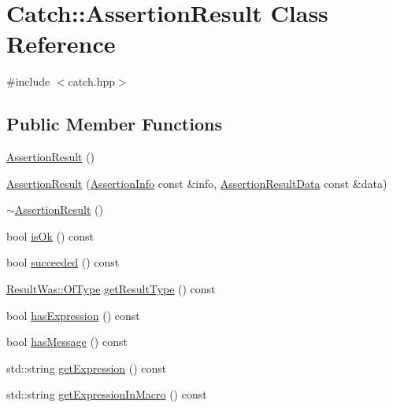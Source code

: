 \hypertarget{class_catch_1_1_assertion_result}{}\section{Catch\+:\+:Assertion\+Result Class Reference}
\label{class_catch_1_1_assertion_result}


{\ttfamily \#include $<$catch.\+hpp$>$}

\subsection*{Public Member Functions}
\begin{DoxyCompactItemize}
\item 
\mbox{\hyperlink{class_catch_1_1_assertion_result_a570b999c5f66e33cb31d3adb29fec25b}{Assertion\+Result}} ()
\item 
\mbox{\hyperlink{class_catch_1_1_assertion_result_ab58aeec27052ba400633ed0e36cea692}{Assertion\+Result}} (\mbox{\hyperlink{struct_catch_1_1_assertion_info}{Assertion\+Info}} const \&info, \mbox{\hyperlink{struct_catch_1_1_assertion_result_data}{Assertion\+Result\+Data}} const \&data)
\item 
\mbox{\hyperlink{class_catch_1_1_assertion_result_abf90f5abd04d38b2fb4f5d575bdc4f1e}{$\sim$\+Assertion\+Result}} ()
\item 
bool \mbox{\hyperlink{class_catch_1_1_assertion_result_ae39658b71c4afc3c8a859043b0e97027}{is\+Ok}} () const
\item 
bool \mbox{\hyperlink{class_catch_1_1_assertion_result_ac5cc872b721d5fb65d87221d30b22fdd}{succeeded}} () const
\item 
\mbox{\hyperlink{struct_catch_1_1_result_was_a624e1ee3661fcf6094ceef1f654601ef}{Result\+Was\+::\+Of\+Type}} \mbox{\hyperlink{class_catch_1_1_assertion_result_ac810750194e1722489d2fd16e8c6a4a8}{get\+Result\+Type}} () const
\item 
bool \mbox{\hyperlink{class_catch_1_1_assertion_result_aba37b4fef1015989df2136592958e984}{has\+Expression}} () const
\item 
bool \mbox{\hyperlink{class_catch_1_1_assertion_result_aae37064b401919fa8ac480ef86cca924}{has\+Message}} () const
\item 
std\+::string \mbox{\hyperlink{class_catch_1_1_assertion_result_a26a777f3959353c729544cb2ace0d279}{get\+Expression}} () const
\item 
std\+::string \mbox{\hyperlink{class_catch_1_1_assertion_result_aac35a0ca42d33bff6467c76573730f5e}{get\+Expression\+In\+Macro}} () const

\end{DoxyCompactItemize}
